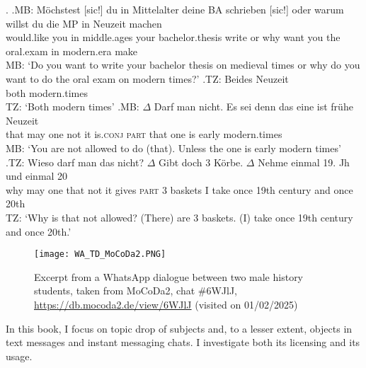 \ex.\label{ex:td.wa.mocoda2}
\ag.MB: Möchstest [sic!] du in Mittelalter deine BA schrieben [sic!] oder warum willst du die MP in Neuzeit machen\\
{} would.like {} you in middle.ages your bachelor.thesis write {} or why want you the oral.exam in modern.era make\\
MB: `Do you want to write your bachelor thesis on medieval times or why do you want to do the oral exam on modern times?' 
\bg.TZ: Beides Neuzeit\\
{} both modern.times\\
TZ: `Both modern times'
\cg.MB: $\Delta$ Darf man nicht. Es sei denn das eine ist frühe Neuzeit\\
{} that may one not it is.\textsc{conj} \textsc{part} that one is early modern.times\\
MB: `You are not allowed to do (that). Unless the one is early modern times'
\dg.TZ: Wieso darf man das nicht?\phantom{mn} $\Delta$ Gibt doch 3 Körbe. $\Delta$ Nehme einmal 19. Jh und einmal 20\\
{} why may one that not it gives \textsc{part} 3 baskets I take once 19th century and once 20th\\
TZ: `Why is that not allowed?\phantom{mn} (There) are 3 baskets. (I) take once 19th century and once 20th.'

\begin{figure}
\centering
\texttt{[image: WA\_TD\_MoCoDa2.PNG]}
\caption{Excerpt from a WhatsApp dialogue between two male history students, taken from MoCoDa2, chat \#6WJlJ, \url{https://db.mocoda2.de/view/6WJlJ} (visited on 01/02/2025)}
\label{fig:td.wa.mocoda2}
\end{figure}

\noindent
In this book, I focus on topic drop of subjects and, to a lesser extent, objects in text messages and instant messaging chats.
I investigate both its licensing and its usage.

